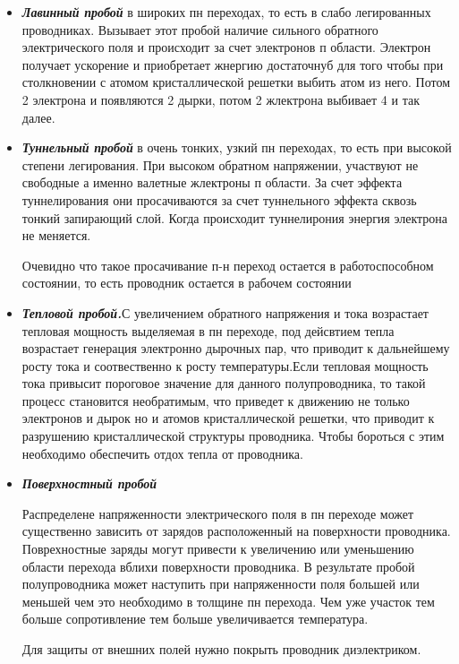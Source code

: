 \documentclass[../main.tex]{subfiles}
\begin{document}
\begin{itemize}
    \item \textbf{\textit{Лавинный пробой}} в широких пн переходах, то есть в слабо легированных проводниках. Вызывает этот пробой наличие сильного
    обратного электрического поля и происходит за счет электронов п области. Электрон получает ускорение и приобретает жнергию достаточнуб для того чтобы при столкновении 
    с атомом кристаллической решетки выбить атом из него. Потом 2 электрона и появляются 2 дырки, потом 2 жлектрона выбивает 4 и так далее.
    \item \textbf{\textit{Туннельный пробой}} в очень тонких, узкий пн переходах, то есть при высокой степени легирования. При высоком обратном напряжении,
    участвуют не свободные а именно валетные жлектроны п области. За счет эффекта туннелирования они просачиваются за счет туннельного эффекта
    сквозь тонкий запирающий слой. Когда происходит туннелирония энергия электрона не меняется.
    
    Очевидно что такое просачивание п-н переход остается в работоспособном состоянии, то есть проводник остается в рабочем состоянии

    \item \textbf{\textit{Тепловой пробой.}}С увеличением обратного напряжения и тока возрастает тепловая мощность выделяемая в пн переходе, под дейсвтием тепла возрастает генерация электронно дырочных пар, что
    приводит к дальнейшему росту тока и соотвественно к росту температуры.Если тепловая мощность тока привысит пороговое значение для данного полупроводника, то
    такой процесс становится необратимым, что приведет к движению не только электронов и дырок но и атомов кристаллической решетки, что приводит к разрушению кристаллической структуры
    проводника. Чтобы бороться с этим необходимо обеспечить отдох тепла от проводника.

    \item \textbf{\textit{Поверхностный пробой}}

    Распределене напряженности электрического поля в пн переходе может существенно зависить от зарядов расположенный на поверхности проводника.
    Поврехностные заряды могут привести к увеличению или уменьшению области перехода вблихи поверхности проводника. В результате пробой полупроводника
    может наступить при напряженности поля большей или меньшей чем это необходимо в толщине пн перехода. Чем уже участок тем больше сопротивление тем больше увеличивается температура.
    
    Для защиты от внешних полей нужно покрыть проводник диэлектриком.
\end{itemize}
\end{document}
